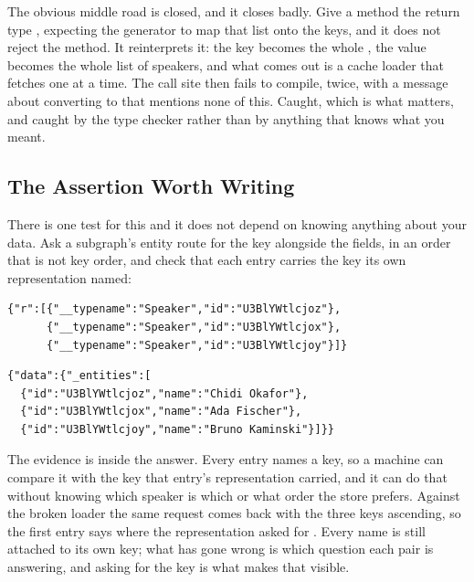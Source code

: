 %
The obvious middle road is closed, and it closes badly. Give a
\code{[DataLoader]} method the return type ,
expecting the generator to map that list onto the keys, and it does not reject
the method. It reinterprets it: the key becomes the whole
, the value becomes the whole list of speakers, and
what comes out is a cache loader that fetches one at a time. The call site then
fails to compile, twice, with a message about converting  to
 that mentions none of this. Caught, which is what matters, and
caught by the type checker rather than by anything that knows what you meant.

\subsection{The Assertion Worth Writing}

%
There is one test for this and it does not depend on knowing anything about
your data. Ask a subgraph's entity route for the key alongside the fields, in
an order that is not key order, and check that each entry carries the key its
own representation named:

\begin{verbatim}
{"r":[{"__typename":"Speaker","id":"U3BlYWtlcjoz"},
      {"__typename":"Speaker","id":"U3BlYWtlcjox"},
      {"__typename":"Speaker","id":"U3BlYWtlcjoy"}]}
\end{verbatim}

\begin{verbatim}
{"data":{"_entities":[
  {"id":"U3BlYWtlcjoz","name":"Chidi Okafor"},
  {"id":"U3BlYWtlcjox","name":"Ada Fischer"},
  {"id":"U3BlYWtlcjoy","name":"Bruno Kaminski"}]}}
\end{verbatim}

%
The evidence is inside the answer. Every entry names a key, so a machine can
compare it with the key that entry's representation carried, and it can do that
without knowing which speaker is which or what order the store prefers. Against
the broken loader the same request comes back with the three keys ascending,
so the first entry says  where the representation asked for
. Every name is still attached to its own key; what has gone
wrong is which question each pair is answering, and asking for the key is what
makes that visible.

